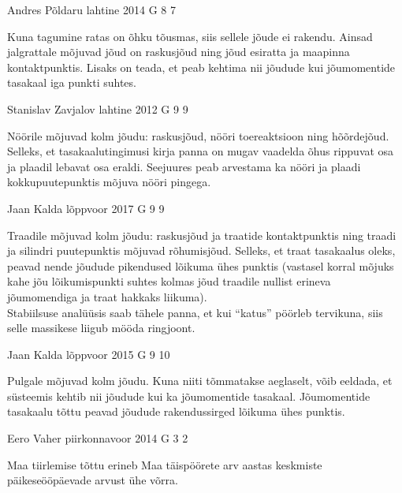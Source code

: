 \documentclass[11pt]{article}
\begin{document}
{%
{Andres Põldaru} %
{lahtine} %
{2014} %
{G 8} %
{7} %
{

\ifHint
Kuna tagumine ratas on õhku tõusmas, siis sellele jõude ei rakendu. Ainsad jalgrattale mõjuvad jõud on raskusjõud ning jõud esiratta ja maapinna kontaktpunktis. Lisaks on teada, et peab kehtima nii jõudude kui jõumomentide tasakaal iga punkti suhtes.
\fi
}

{Stanislav Zavjalov} %
{lahtine} %
{2012} %
{G 9} %
{9} %
{

\ifHint
Nöörile mõjuvad kolm jõudu: raskusjõud, nööri toereaktsioon ning hõõrdejõud. Selleks, et tasakaalutingimusi kirja panna on mugav vaadelda õhus rippuvat osa ja plaadil lebavat osa eraldi. Seejuures peab arvestama ka nööri ja plaadi kokkupuutepunktis mõjuva nööri pingega.
\fi
}

{Jaan Kalda} %
{lõppvoor} %
{2017} %
{G 9} %
{9} %
{

\ifHint
Traadile mõjuvad kolm jõudu: raskusjõud ja traatide kontaktpunktis ning traadi ja silindri puutepunktis mõjuvad rõhumisjõud. Selleks, et traat tasakaalus oleks, peavad nende jõudude pikendused lõikuma ühes punktis (vastasel korral mõjuks kahe jõu lõikumispunkti suhtes kolmas jõud traadile nullist erineva jõumomendiga ja traat hakkaks liikuma).\\
Stabiilsuse analüüsis saab tähele panna, et kui \enquote{katus} pöörleb tervikuna, siis selle massikese liigub mööda ringjoont.
\fi
}

{Jaan Kalda} %
{lõppvoor} %
{2015} %
{G 9} %
{10} %
{

\ifHint
Pulgale mõjuvad kolm jõudu. Kuna niiti tõmmatakse aeglaselt, võib eeldada, et süsteemis kehtib nii jõudude kui ka jõumomentide tasakaal. Jõumomentide tasakaalu tõttu peavad jõudude rakendussirged lõikuma ühes punktis.
\fi
}

{Eero Vaher} %
{piirkonnavoor} %
{2014} %
{G 3} %
{2} %
{

\ifHint
Maa tiirlemise tõttu erineb Maa täispöörete arv aastas keskmiste päikeseööpäevade arvust ühe võrra.
\fi
}

}
\end{document}
